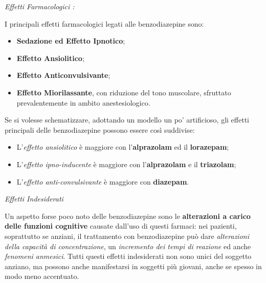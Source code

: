 \begin{itemize}
\emph{\emph{Effetti Farmacologici :}}

I principali effetti farmacologici legati alle benzodiazepine sono:

\begin{itemize}
\item
  \textbf{Sedazione ed Effetto Ipnotico};
\item
  \textbf{Effetto Ansiolitico};
\item
  \textbf{Effetto Anticonvulsivante};
\item
  \textbf{Effetto Miorilassante}, con riduzione del tono muscolare,
  sfruttato prevalentemente in ambito anestesiologico.
\end{itemize}

Se si volesse schematizzare, adottando un modello un po' artificioso,
gli effetti principali delle benzodiazepine possono essere così
suddivise:

\begin{itemize}
\item
  L'\emph{effetto ansiolitico} è maggiore con l'\textbf{alprazolam} ed
  il \textbf{lorazepam};
\item
  L'\emph{effetto ipno-inducente} è maggiore con l'\textbf{alprazolam} e
  il \textbf{triazolam};
\item
  L'\emph{effetto anti-convulsivante} è maggiore con \textbf{diazepam}.
\end{itemize}

\emph{\emph{Effetti Indesiderati}}

Un aspetto forse poco noto delle benzodiazepine sono le
\textbf{alterazioni a carico delle funzioni cognitive} causate dall'uso
di questi farmaci: nei pazienti, soprattutto se anziani, il trattamento
con benzodiazepine può dare \emph{alterazioni della capacità di
concentrazione}, un \emph{incremento dei tempi di reazione} ed anche
\emph{fenomeni anmesici}. Tutti questi effetti indesiderati non sono
unici del soggetto anziano, ma possono anche manifestarsi in soggetti
più giovani, anche se spesso in modo meno accentuato.


\end{itemize}
